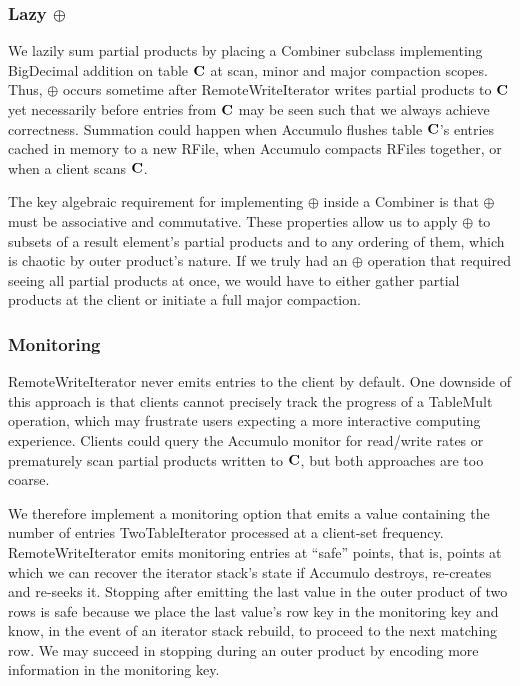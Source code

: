 \subsubsection{Lazy $\oplus$}
We lazily sum partial products by placing a Combiner subclass implementing BigDecimal addition 
on table $\mathbf{C}$ at scan, minor and major compaction scopes.
Thus, $\oplus$ occurs sometime after RemoteWriteIterator writes partial products to $\mathbf{C}$
yet necessarily before entries from $\mathbf{C}$ may be seen such that we always achieve correctness.
Summation could happen when Accumulo flushes table $\mathbf{C}$'s entries cached in memory to a new RFile, 
when Accumulo compacts RFiles together, or when a client scans $\mathbf{C}$. 

The key algebraic requirement for implementing $\oplus$ inside a Combiner
is that $\oplus$ must be associative and commutative.
These properties allow us to apply $\oplus$ to subsets of a result element's partial products 
and to any ordering of them, which is chaotic by outer product's nature.
If we truly had an $\oplus$ operation that required seeing all partial products at once,
we would have to either gather partial products at the client or initiate a full major compaction.

\subsubsection{Monitoring}
RemoteWriteIterator never emits entries to the client by default. 
One downside of this approach is that clients cannot precisely track the progress of a TableMult operation,
which may frustrate users expecting a more interactive computing experience.
Clients could query the Accumulo monitor for read/write rates 
or prematurely scan partial products written to $\mathbf{C}$, but both approaches are too coarse.

We therefore implement a monitoring option that emits a value
containing the number of entries TwoTableIterator processed
at a client-set frequency.
RemoteWriteIterator emits monitoring entries at ``safe'' points, that is,
points at which we can recover the iterator stack's state 
if Accumulo destroys, re-creates and re-seeks it.
Stopping after emitting the last value in the outer product of two rows is safe 
because we place the last value's row key in the monitoring key and know, 
in the event of an iterator stack rebuild, to proceed to the next matching row.
We may succeed in stopping during an outer product 
by encoding more information in the monitoring key.


